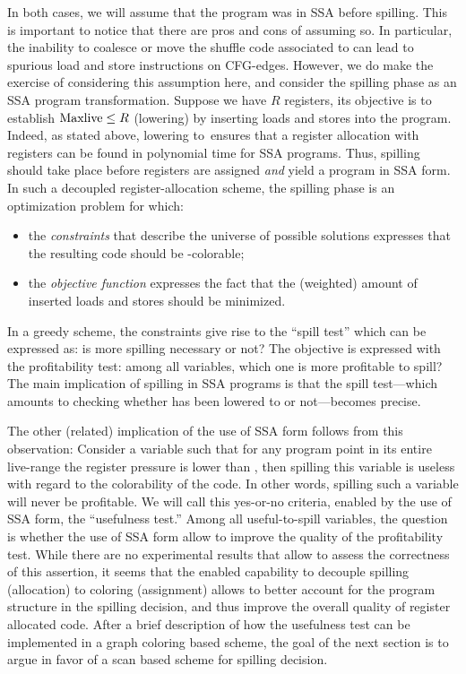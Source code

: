 {In both cases, we will assume that the program was in SSA before spilling. 
This is important to notice that there are pros and cons of assuming so. 
In particular, the inability to coalesce or move the shuffle code associated to \phifuns can lead to spurious load and store instructions on CFG-edges. 
However, we do make the exercise of considering this assumption here, and consider the spilling phase as an SSA program transformation.
Suppose we have $R$ registers, its objective is to establish $\mathrm{Maxlive}\le R$ (\maxlive lowering) by inserting loads and stores into the program. 
Indeed, as stated above, lowering \maxlive to~\regs ensures that a register allocation with \regs registers can be found in polynomial time for SSA programs. 
Thus, spilling should take place before registers are assigned \emph{and} yield a program in SSA form. 
In such a decoupled register-allocation scheme, the spilling phase is an optimization problem for which: 
\begin{itemize}
  \item the \emph{constraints} that describe the universe of possible solutions expresses that the resulting code should be \regs-colorable; 
  \item the \emph{objective function} expresses the fact that the (weighted) amount of inserted loads and stores should be minimized.
\end{itemize}

In a greedy scheme, the constraints give rise to the ``spill test'' which can be expressed as: 
is more spilling necessary or not? 
The objective is expressed with the profitability test: 
among all variables, which one is more profitable to spill? 
The main implication of spilling in SSA programs is that the spill test---which amounts to checking whether \maxlive has been lowered to \regs or not---becomes precise. 

The other (related) implication of the use of SSA form follows from this observation: 
Consider a variable such that for any program point in its entire live-range the register pressure is lower than \regs, then spilling this variable is useless with regard to the colorability of the code.
In other words, spilling such a variable will never be profitable. 
We will call this yes-or-no criteria, enabled by the use of SSA form, the ``usefulness test.''
Among all useful-to-spill variables, the question is whether the use of SSA form allow to improve the quality of the profitability test.
While there are no experimental results that allow to assess the correctness of this assertion, it seems that the enabled capability to decouple spilling  (allocation) to coloring (assignment) allows to better account for the program structure in the spilling decision, and thus improve the overall quality of register allocated code.
After a brief description of how the usefulness test can be implemented in a graph coloring based scheme, the goal of the next section is to argue in favor of a scan based scheme for spilling decision.

}
